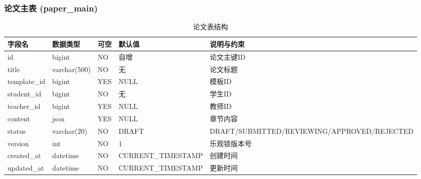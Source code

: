 \documentclass{../template/softeng}
\begin{document}
	\subsubsection{论文主表 (paper\_main)}
	\begin{table}[htbp]
		\centering
		\begin{tabular}{|l|l|l|l|l|}
			\hline
			\textbf{字段名} & \textbf{数据类型} & \textbf{可空} & \textbf{默认值} & \textbf{说明与约束} \\
			\hline
			id & bigint & NO & 自增 & 论文主键ID \\
			title & varchar(500) & NO & 无 & 论文标题 \\
			template\_id & bigint & YES & NULL & 模板ID \\
			student\_id & bigint & NO & 无 & 学生ID \\
			teacher\_id & bigint & YES & NULL & 教师ID \\
			content & json & YES & NULL & 章节内容 \\
			status & varchar(20) & NO & DRAFT & DRAFT/SUBMITTED/REVIEWING/APPROVED/REJECTED \\
			version & int & NO & 1 & 乐观锁版本号 \\
			created\_at & datetime & NO & CURRENT\_TIMESTAMP & 创建时间 \\
			updated\_at & datetime & NO & CURRENT\_TIMESTAMP & 更新时间 \\
			\hline
		\end{tabular}
		\caption{论文表结构}
	\end{table}
\end{document}
